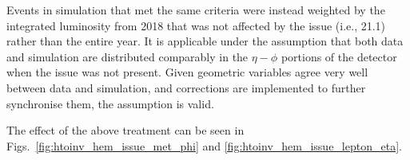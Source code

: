 \medskip

\noindent{}Events in simulation that met the same criteria were instead weighted by the integrated luminosity from 2018 that was not affected by the issue (i.e., 21.1\fbinv) rather than the entire year. It is applicable under the assumption that both data and simulation are distributed comparably in the $\eta-\phi$ portions of the detector when the issue was not present. Given geometric variables agree very well between data and simulation, and corrections are implemented to further synchronise them, the assumption is valid.

The effect of the above treatment can be seen in Figs.~\ref{fig:htoinv_hem_issue_met_phi} and \ref{fig:htoinv_hem_issue_lepton_eta}.

